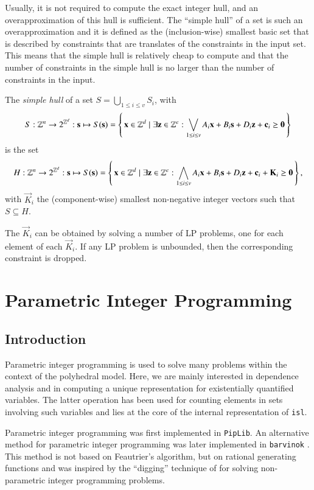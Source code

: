 Usually, it is not required to compute the exact integer hull,
and an overapproximation of this hull is sufficient.
The ``simple hull'' of a set is such an overapproximation
and it is defined as the (inclusion-wise) smallest basic set
that is described by constraints that are translates of
the constraints in the input set.
This means that the simple hull is relatively cheap to compute
and that the number of constraints in the simple hull is no
larger than the number of constraints in the input.
\begin{definition}
The {\em simple hull} of a set
$S = \bigcup_{1 \le i \le v} S_i$, with
$$
S : \Z^n \to 2^{\Z^d} : \vec s \mapsto
S(\vec s) =
\left\{\, \vec x \in \Z^d \mid \exists \vec z \in \Z^e :
\bigvee_{1 \le i \le v}
A_i \vec x + B_i \vec s + D_i \vec z + \vec c_i \geq \vec 0 \,\right\}
$$
is the set
$$
H : \Z^n \to 2^{\Z^d} : \vec s \mapsto
S(\vec s) =
\left\{\, \vec x \in \Z^d \mid \exists \vec z \in \Z^e :
\bigwedge_{1 \le i \le v}
A_i \vec x + B_i \vec s + D_i \vec z + \vec c_i + \vec K_i \geq \vec 0
\,\right\}
,
$$
with $\vec K_i$ the (component-wise) smallest non-negative integer vectors
such that $S \subseteq H$.
\end{definition}
The $\vec K_i$ can be obtained by solving a number of
LP problems, one for each element of each $\vec K_i$.
If any LP problem is unbounded, then the corresponding constraint
is dropped.

\section{Parametric Integer Programming}

\subsection{Introduction}\label{s:intro}

Parametric integer programming \parencite{Feautrier88parametric}
is used to solve many problems within the context of the polyhedral model.
Here, we are mainly interested in dependence analysis \parencite{Fea91}
and in computing a unique representation for existentially quantified
variables.  The latter operation has been used for counting elements
in sets involving such variables
\parencite{BouletRe98,Verdoolaege2005experiences} and lies at the core
of the internal representation of {\tt isl}.

Parametric integer programming was first implemented in \texttt{PipLib}.
An alternative method for parametric integer programming
was later implemented in {\tt barvinok} \cite{barvinok-0.22}.
This method is not based on Feautrier's algorithm, but on rational
generating functions \cite{Woods2003short} and was inspired by the
``digging'' technique of \textcite{DeLoera2004Three} for solving
non-parametric integer programming problems.

